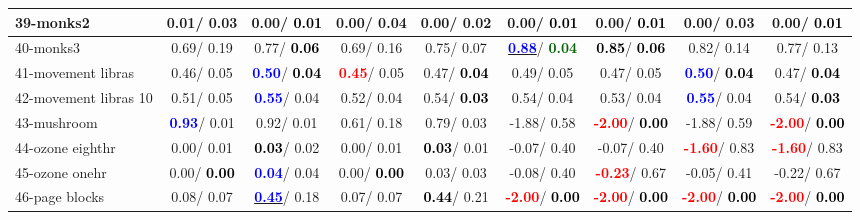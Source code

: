 \begin{table}[h]
\begin{center}
\begin{tabular}{lc|c|c|c|c|c|c|c}
39-monks2 &   0.01/  0.03 &   0.00/\textcolor{black}{\textbf{  0.01}} &   0.00/  0.04 &   0.00/  0.02 &   0.00/\textcolor{black}{\textbf{  0.01}} &   0.00/\textcolor{black}{\textbf{  0.01}} &   0.00/  0.03 &   0.00/\textcolor{black}{\textbf{  0.01}} \\ \hline
40-monks3 &   0.69/  0.19 &   0.77/\textcolor{black}{\textbf{  0.06}} &   0.69/  0.16 &   0.75/  0.07 & \underline{\textcolor{blue}{\textbf{  0.88}}}/\textcolor{darkgreen}{\textbf{  0.04}} & \textcolor{black}{\textbf{  0.85}}/\textcolor{black}{\textbf{  0.06}} &   0.82/  0.14 &   0.77/  0.13 \\
41-movement libras &   0.46/  0.05 & \textcolor{blue}{\textbf{  0.50}}/\textcolor{black}{\textbf{  0.04}} & \textcolor{red}{\textbf{  0.45}}/  0.05 &   0.47/\textcolor{black}{\textbf{  0.04}} &   0.49/  0.05 &   0.47/  0.05 & \textcolor{blue}{\textbf{  0.50}}/\textcolor{black}{\textbf{  0.04}} &   0.47/\textcolor{black}{\textbf{  0.04}} \\
42-movement libras 10 &   0.51/  0.05 & \textcolor{blue}{\textbf{  0.55}}/  0.04 &   0.52/  0.04 &   0.54/\textcolor{black}{\textbf{  0.03}} &   0.54/  0.04 &   0.53/  0.04 & \textcolor{blue}{\textbf{  0.55}}/  0.04 &   0.54/\textcolor{black}{\textbf{  0.03}} \\
43-mushroom & \textcolor{blue}{\textbf{  0.93}}/  0.01 &   0.92/  0.01 &   0.61/  0.18 &   0.79/  0.03 &  -1.88/  0.58 & \textcolor{red}{\textbf{ -2.00}}/\textcolor{black}{\textbf{  0.00}} &  -1.88/  0.59 & \textcolor{red}{\textbf{ -2.00}}/\textcolor{black}{\textbf{  0.00}} \\
44-ozone eighthr &   0.00/  0.01 & \textcolor{black}{\textbf{  0.03}}/  0.02 &   0.00/  0.01 & \textcolor{black}{\textbf{  0.03}}/  0.01 &  -0.07/  0.40 &  -0.07/  0.40 & \textcolor{red}{\textbf{ -1.60}}/  0.83 & \textcolor{red}{\textbf{ -1.60}}/  0.83 \\
45-ozone onehr &   0.00/\textcolor{black}{\textbf{  0.00}} & \textcolor{blue}{\textbf{  0.04}}/  0.04 &   0.00/\textcolor{black}{\textbf{  0.00}} &   0.03/  0.03 &  -0.08/  0.40 & \textcolor{red}{\textbf{ -0.23}}/  0.67 &  -0.05/  0.41 &  -0.22/  0.67 \\
46-page blocks &   0.08/  0.07 & \underline{\textcolor{blue}{\textbf{  0.45}}}/  0.18 &   0.07/  0.07 & \textcolor{black}{\textbf{  0.44}}/  0.21 & \textcolor{red}{\textbf{ -2.00}}/\textcolor{black}{\textbf{  0.00}} & \textcolor{red}{\textbf{ -2.00}}/\textcolor{black}{\textbf{  0.00}} & \textcolor{red}{\textbf{ -2.00}}/\textcolor{black}{\textbf{  0.00}} & \textcolor{red}{\textbf{ -2.00}}/\textcolor{black}{\textbf{  0.00}} \\ \hline

\end{tabular}
\end{center}
\end{table}

